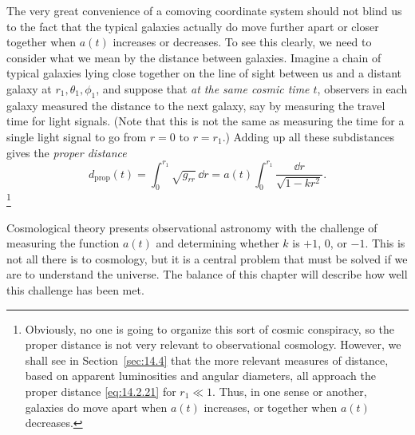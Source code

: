 The very great convenience of a comoving coordinate system should not blind
us to the fact that the typical galaxies actually do move further apart or
closer together when \(a(t)\) increases or decreases. To see this clearly,
we need to consider what we mean by the distance between galaxies. Imagine a
chain of typical galaxies lying close together on the line of sight between
us and a distant galaxy at \(r_1,\theta_1,\phi_1\), and suppose that
\emph{at the same cosmic time \(t\)}, observers in each galaxy measured the
distance to the next galaxy, say by measuring the travel time for light
signals. (Note that this is not the same as measuring the time for a single
light signal to go from \(r=0\) to \(r=r_1\).) Adding up all these
subdistances gives the \emph{proper distance}
\begin{equation}
  d_{\mathrm{prop}}(t)
  =
  \int_0^{r_1}\sqrt{g_{rr}}\,\dd r
  =
  a(t)\int_0^{r_1}\frac{\dd r}{\sqrt{1-kr^2}}.
  \tag{14.2.21}\label{eq:14.2.21}
\end{equation}
\footnote{Obviously, no one is going to organize this sort of cosmic
conspiracy, so the proper distance is not very relevant to observational
cosmology. However, we shall see in Section~\ref{sec:14.4} that the more
relevant measures of distance, based on apparent luminosities and angular
diameters, all approach the proper distance \eqref{eq:14.2.21} for
\(r_1\ll1\). Thus, in one sense or another, galaxies do move apart when
\(a(t)\) increases, or together when \(a(t)\) decreases.}

Cosmological theory presents observational astronomy with the challenge of
measuring the function \(a(t)\) and determining whether \(k\) is \(+1\),
\(0\), or \(-1\). This is not all there is to cosmology, but it is a central
problem that must be solved if we are to understand the universe. The balance
of this chapter will describe how well this challenge has been met.

